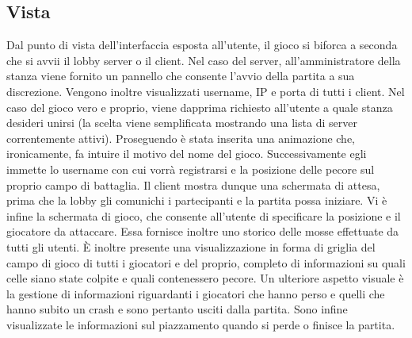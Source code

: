 \subsection{Vista}


Dal punto di vista dell'interfaccia esposta all’utente, il gioco si biforca a seconda che
si avvii il lobby server o il client. Nel caso del server, all’amministratore della stanza
viene fornito un pannello che consente l’avvio della partita a sua discrezione. Vengono
inoltre visualizzati username, IP e porta di tutti i client.
Nel caso del gioco vero e proprio, viene dapprima richiesto all’utente a quale stanza
desideri unirsi (la scelta viene semplificata mostrando una lista di server correntemente attivi).
Proseguendo è stata inserita una animazione che, ironicamente, fa intuire il motivo del nome del gioco.
Successivamente egli immette lo username con cui vorrà registrarsi e la posizione delle pecore sul
proprio campo di battaglia. Il client mostra dunque una schermata di attesa, prima
che la lobby gli comunichi i partecipanti e la partita possa iniziare.
Vi è infine la schermata di gioco, che consente all’utente di specificare la posizione e
il giocatore da attaccare. Essa fornisce inoltre uno storico delle mosse effettuate da
tutti gli utenti. È inoltre presente una visualizzazione in forma di griglia del campo
di gioco di tutti i giocatori e del proprio, completo di informazioni su quali celle siano
state colpite e quali contenessero pecore. Un ulteriore aspetto visuale è la gestione
di informazioni riguardanti i giocatori che hanno perso e quelli che hanno subito un
crash e sono pertanto usciti dalla partita. Sono infine visualizzate le informazioni sul
piazzamento quando si perde o finisce la partita.